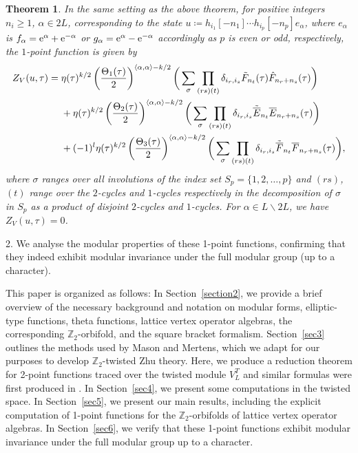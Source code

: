 \documentclass[pdftex]{sigma}
\numberwithin{equation}{section}
\newtheorem{Theorem}{Theorem}[section]
\theoremstyle{definition}
\begin{document}
 \begin{Theorem}
In the same setting as the above theorem, for positive integers $n_i\geq 1$, $\alpha\in 2L$, corresponding to the state
$u\coloneqq h_{i_1}[-n_1]\cdots h_{i_p}[-n_p]e_{\alpha}$,
where $e_{\alpha}$ is $f_{\alpha}={\rm e}^{\alpha}+{\rm e}^{-\alpha}$ or $g_{\alpha}={\rm e}^{\alpha}-{\rm e}^{-\alpha}$ accordingly as $p$ is even or odd, respectively, the $1$-point function is given by
\begin{align*}
Z_V(u,\tau)={}&\eta(\tau)^{k/2}\left(\frac{\Theta_1(\tau)}{2}\right)^{\langle\alpha,\alpha\rangle-k/2}\bigg(\sum_{\sigma} \prod_{(rs)(t)}\delta_{i_r,i_s}\Tilde{F}_{n_t}(\tau)\hat{F}_{n_r+n_s}(\tau)\bigg)\\
&+\eta(\tau)^{k/2}\left(\frac{\Theta_2(\tau)}{2}\right)^{\langle\alpha,\alpha\rangle-k/2}
\bigg(\sum_{\sigma}\prod_{(rs)(t)}\delta_{i_r,i_s}\Tilde{\overline{E}}_{n_t}\overline{E}_{n_r+n_s}(\tau)\bigg)\\
&+(-1)^l\eta(\tau)^{k/2}\left(\frac{\Theta_3(\tau)}{2}\right)^{\langle\alpha,\alpha\rangle-k/2}
\bigg(\sum_{\sigma}\prod_{(rs)(t)}\delta_{i_r,i_s}\Tilde{\overline{F}}_{n_t}\overline{F}_{n_r+n_s}(\tau)\bigg),
\end{align*}
where $\sigma$ ranges over all involutions of the index set $S_p=\{1,2,\dots, p\}$ and $(rs)$, $(t)$ range over the $2$-cycles and $1$-cycles respectively in the decomposition of $\sigma$ in $S_p$ as a product of disjoint $2$-cycles and $1$-cycles. For $\alpha\in L\backslash 2L$, we have
$Z_V(u,\tau)=0$.
\end{Theorem}

2. We analyse the modular properties of these 1-point functions, confirming that they indeed exhibit modular invariance under the full modular group (up to a character).

This paper is organized as follows: In Section~\ref{section2}, we provide a brief overview of the necessary background and notation on modular forms, elliptic-type functions, theta functions, lattice vertex operator algebras, the corresponding $\mathbb{Z}_2$-orbifold, and the square bracket formalism. Section~\ref{sec3} outlines the methods used by Mason and Mertens, which we adapt for our purposes to develop $\mathbb{Z}_2$-twisted Zhu theory. Here, we produce a reduction theorem for 2-point functions traced over the twisted module $V_L^T$ and similar formulas were first produced in \cite[Theorem~8.4]{Dong2000Modular}. In Section~\ref{sec4}, we present some computations in the twisted space. In Section~\ref{sec5}, we present our main results, including the explicit computation of 1-point functions for the \( \mathbb{Z}_2 \)-orbifolds of lattice vertex operator algebras. In Section~\ref{sec6}, we verify that these 1-point functions exhibit modular invariance under the full modular group up to a character.
\end{document}
